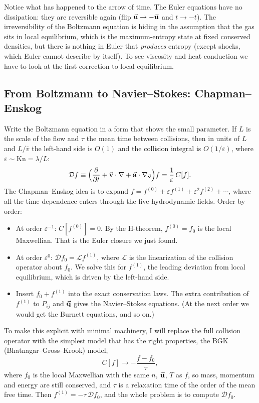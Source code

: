 Notice what has happened to the arrow of time. The Euler equations have no dissipation: they are reversible again (flip $\va u\to-\va u$ and $t\to-t$). The irreversibility of the Boltzmann equation is hiding in the assumption that the gas sits in local equilibrium, which is the maximum-entropy state at fixed conserved densities, but there is nothing in Euler that \emph{produces} entropy (except shocks, which Euler cannot describe by itself). To see viscosity and heat conduction we have to look at the first correction to local equilibrium.

\subsection{From Boltzmann to Navier--Stokes: Chapman--Enskog}

Write the Boltzmann equation in a form that shows the small parameter. If $L$ is the scale of the flow and $\tau$ the mean time between collisions, then in units of $L$ and $L/\bar v$ the left-hand side is $O(1)$ and the collision integral is $O(1/\varepsilon)$, where $\varepsilon\sim\mathrm{Kn}=\lambda/L$:
\[
\mathcal D f \equiv \Big(\pdv{}{t}+\va v\cdot\nabla+\va a\cdot\nabla_{\va v}\Big)f=\frac1\varepsilon\,C[f].
\]
The Chapman--Enskog idea is to expand $f=f^{(0)}+\varepsilon f^{(1)}+\varepsilon^2f^{(2)}+\cdots$, where all the time dependence enters through the five hydrodynamic fields. Order by order:
\begin{itemize}
  \item At order $\varepsilon^{-1}$: $C[f^{(0)}]=0$. By the H-theorem, $f^{(0)}=f_0$ is the local Maxwellian. That is the Euler closure we just found.
  \item At order $\varepsilon^{0}$: $\mathcal D f_0=\mathcal L f^{(1)}$, where $\mathcal L$ is the linearization of the collision operator about $f_0$. We solve this for $f^{(1)}$, the leading deviation from local equilibrium, which is driven by the left-hand side.
  \item Insert $f_0+f^{(1)}$ into the exact conservation laws. The extra contribution of $f^{(1)}$ to $P_{ij}$ and $\va q$ gives the Navier--Stokes equations. (At the next order we would get the Burnett equations, and so on.)
\end{itemize}

To make this explicit with minimal machinery, I will replace the full collision operator with the simplest model that has the right properties, the BGK (Bhatnagar--Gross--Krook) model,
\[
C[f]\to-\frac{f-f_0}{\tau},
\]
where $f_0$ is the local Maxwellian with the same $n$, $\va u$, $T$ as $f$, so mass, momentum and energy are still conserved, and $\tau$ is a relaxation time of the order of the mean free time. Then $f^{(1)}=-\tau\,\mathcal Df_0$, and the whole problem is to compute $\mathcal Df_0$.

